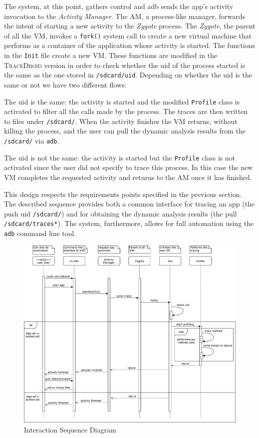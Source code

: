 The system, at this point, gathers control and adb sends the app's activity
invocation to the \textit{Activity Manager}. The AM, a process-like
manager, forwards the intent of starting a new activity to the \emph{Zygote}
process. The \emph{Zygote}, the parent of all the VM, invokes a \texttt{fork()} system
call to create a new virtual machine that performs as a container of
the application whose activity is started. The functions in the \texttt{Init} file create a new VM. These functions are modified in the \textsc{TraceDroid} version
in order to check whether the uid of the process started is the same as the
one stored in \texttt{/sdcard/uid}. Depending on whether the uid is the same or
not we have two different flows:
\begin{enumerate*}
  \item The uid is the same: the activity is started and the modified \texttt{Profile} class is activated to filter all the calls made by the process. The traces are then written to files under \texttt{/sdcard/}. When the activity finishes the VM returns, without killing the process, and the user can pull the dynamic analysis results from the \texttt{/sdcard/} via \texttt{adb}. 
  \item The uid is not the same: the activity is started but the \texttt{Profile} class is not activated since the user did not specify to trace this process. In this case the new VM completes the requested activity and returns to the AM once it has finished. 
\end{enumerate*}

This design respects the requirements points specified in the previous
section. The described sequence provides both a common interface for
tracing an app (the push uid \texttt{/sdcard/}) and for obtaining the dynamic
analysis results (the pull \texttt{/sdcard/traces*}). The system, furthermore,
allows for full automation using the \texttt{adb} command line tool.

\begin{figure}[!h]
    \centering
    \includegraphics[width=15cm]{./img/design/interaction.pdf}
    \caption{Interaction Sequence Diagram}
    \label{fig:scope_interaction}
\end{figure}
